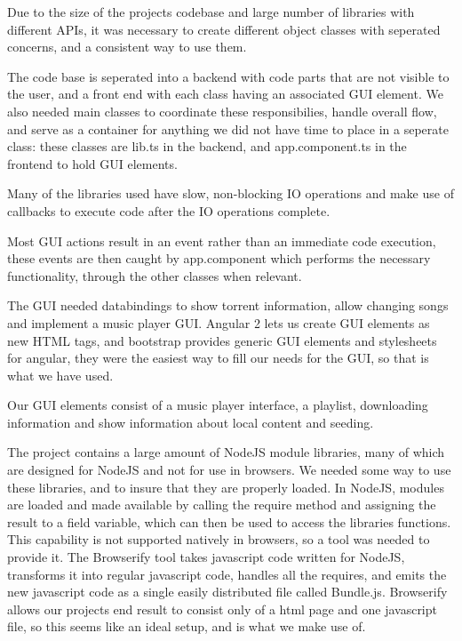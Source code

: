 Due to the size of the projects codebase and large number of libraries with different \acs{API}s, 
it was necessary to create different object classes with seperated concerns,
and a consistent way to use them.
\newline

The code base is seperated into a backend with code parts that are not visible to the user,
and a front end with each class having an associated \acs{GUI} element.
We also needed main classes to coordinate these responsibilies, handle overall flow,
and serve as a container for anything we did not have time to place in a seperate class:
these classes are lib.ts in the backend,
and app.component.ts in the frontend to hold \acs{GUI} elements.

Many of the libraries used have slow, non-blocking IO operations
and make use of callbacks to execute code after the IO operations complete.

Most \acs{GUI} actions result in an event rather than an immediate code execution, 
these events are then caught by app.component
which performs the necessary functionality, through the other classes when relevant.
\newline

The \acs{GUI} needed databindings to show torrent information, allow changing songs
and implement a music player \acs{GUI}. 
Angular 2 lets us create \acs{GUI} elements as new \acs{HTML} tags, 
and bootstrap provides generic \acs{GUI} elements and stylesheets for angular, 
they were the easiest way to fill our needs for the \acs{GUI},
so that is what we have used.

Our \acs{GUI} elements consist of a music player interface, a playlist, downloading information 
and show information about local content and seeding.
\newline

The project contains a large amount of NodeJS module libraries, 
many of which are designed for NodeJS and not for use in browsers.
We needed some way to use these libraries, and to insure that they are properly loaded.
In NodeJS, modules are loaded and made available by calling the require method 
and assigning the result to a field variable, which can then be used to access the libraries functions.
This capability is not supported natively in browsers, so a tool was needed to provide it.
The Browserify tool takes javascript code written for NodeJS, 
transforms it into regular javascript code, 
handles all the requires, 
and emits the new javascript code as a single easily distributed file called Bundle.js.
Browserify allows our projects end result to consist only of a html page and one javascript file, 
so this seems like an ideal setup, and is what we make use of.
\newline

